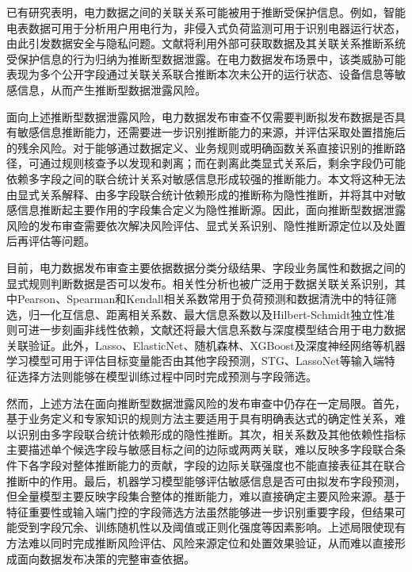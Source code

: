 \documentclass[UTF8,zihao=5,twoside,fontset=none]{ctexart}
\begin{document}
已有研究表明，电力数据之间的关联关系可能被用于推断受保护信息。例如，智能电表数据可用于分析用户用电行为\cite{ref-sankar,ref-giaconi}，非侵入式负荷监测可用于识别电器运行状态\cite{ref-chen-privacy,ref-wang-meter}，由此引发数据安全与隐私问题\cite{ref-adewole,ref-zhang-sgcc,ref-xi-fdia}。文献\cite{ref-liu-data-inference}将利用外部可获取数据及其关联关系推断系统受保护信息的行为归纳为推断型数据泄露。在电力数据发布场景中，该类威胁可能表现为多个公开字段通过关联关系联合推断本次未公开的运行状态、设备信息等敏感信息，从而产生推断型数据泄露风险。

面向上述推断型数据泄露风险，电力数据发布审查不仅需要判断拟发布数据是否具有敏感信息推断能力，还需要进一步识别推断能力的来源，并评估采取处置措施后的残余风险。对于能够通过数据定义、业务规则或明确函数关系直接识别的推断路径，可通过规则核查予以发现和剥离；而在剥离此类显式关系后，剩余字段仍可能依赖多字段之间的联合统计关系对敏感信息形成较强的推断能力。本文将这种无法由显式关系解释、由多字段联合统计依赖形成的推断称为隐性推断，并将其中对敏感信息推断起主要作用的字段集合定义为隐性推断源。因此，面向推断型数据泄露风险的发布审查需要依次解决风险评估、显式关系识别、隐性推断源定位以及处置后再评估等问题。

目前，电力数据发布审查主要依据数据分类分级结果、字段业务属性和数据之间的显式规则判断数据是否可以发布。相关性分析也被广泛用于数据关联关系识别，其中Pearson、Spearman和Kendall相关系数\cite{ref-pearson,ref-spearman,ref-kendall}常用于负荷预测和数据清洗中的特征筛选\cite{ref-lan-load,ref-jiao-pv,ref-deng-load,ref-wang-evload}，归一化互信息\cite{ref-cover-info}、距离相关系数\cite{ref-szekely-dcorr}、最大信息系数\cite{ref-reshef-mic}以及Hilbert-Schmidt独立性准则\cite{ref-gretton-hsic}可进一步刻画非线性依赖，文献\cite{ref-xing-micdnn}还将最大信息系数与深度模型结合用于电力数据关联验证。此外，Lasso、ElasticNet、随机森林、XGBoost及深度神经网络等机器学习模型可用于评估目标变量能否由其他字段预测\cite{ref-tibshirani-lasso,ref-zou-enet,ref-breiman-rf,ref-chen-xgboost,ref-lecun-deep,ref-li-feature}，STG\cite{ref-stg}、LassoNet\cite{ref-lassonet}等输入端特征选择方法则能够在模型训练过程中同时完成预测与字段筛选。

然而，上述方法在面向推断型数据泄露风险的发布审查中仍存在一定局限。首先，基于业务定义和专家知识的规则方法主要适用于具有明确表达式的确定性关系，难以识别由多字段联合统计依赖形成的隐性推断。其次，相关系数及其他依赖性指标主要描述单个候选字段与敏感目标之间的边际或两两关联，难以反映多字段联合条件下各字段对整体推断能力的贡献，字段的边际关联强度也不能直接表征其在联合推断中的作用。最后，机器学习模型能够评估敏感信息是否可由拟发布字段预测，但全量模型主要反映字段集合整体的推断能力，难以直接确定主要风险来源。基于特征重要性或输入端门控的字段筛选方法虽然能够进一步识别重要字段，但结果可能受到字段冗余、训练随机性以及阈值或正则化强度等因素影响。上述局限使现有方法难以同时完成推断风险评估、风险来源定位和处置效果验证，从而难以直接形成面向数据发布决策的完整审查依据。
\end{document}
